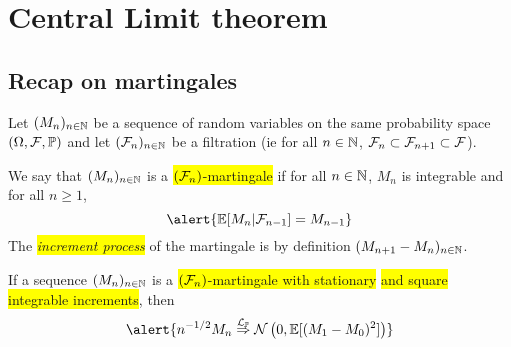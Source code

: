 \documentclass[usenames,dvipsnames]{beamer}
\newcommand\colbox[1]{\colorbox{Yellow}{#1}}
\begin{document}
\section{Central Limit theorem}
\subsection{Recap on martingales}

\begin{frame}
    Let $(M_n)_{n \in \mathbb{N}}$ be a sequence of random variables on the same probability space $(\Omega,\mathcal{F},\mathbb{P})$ and let $(\mathcal{F}_n)_{n\in\mathbb{N}}$ be a filtration (ie for all $n\in\mathbb{N}$, $\mathcal{F}_n\subset \mathcal{F}_{n+1}\subset \mathcal{F}$). 
    \begin{definition}
        We say that $(M_n)_{n \in \mathbb{N}}$ is a \colbox{\rm $(\mathcal{F}_n)$-martingale} if for all $n\in\mathbb{N}$, $M_n$ is integrable and for all $n\geq 1$,
    $$
    \alert{\PE[M_n|\mcf_{n-1}]=M_{n-1}}
    $$
    \pause 
    The \colbox{\em increment process} of the martingale is by definition $(M_{n+1}-M_n)_{n\in\mathbb{N}}$.
    \end{definition}
    \pause    
    \begin{theorem} \label{thm:clt:marting} 
    If a sequence $(M_n)_{n \in \mathbb{N}}$ is a \colbox{$(\mathcal{F}_n)$-martingale with stationary} \colbox{and square integrable increments}, then
    $$
    \alert{n^{-1/2} M_n \dlim{\PP} \gauss\lr{0,\PE[(M_1-M_0)^2]}}
    $$
    \end{theorem}
\end{frame}
\end{document}
